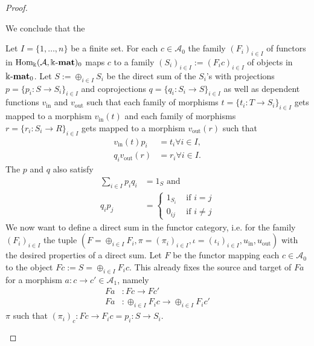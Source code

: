 \begin{proof}
\begin{enumerate}
\begin{subproof}[Proof of (ii)]
We conclude that the 
\end{subproof}

\begin{subproof}[Proof of (ii)]
Let $I = \{1,\dots,n\}$ be a finite set. For each $c \in \mathcal{A}_{0}$ the family $(F_{i})_{i\in I}$ of functors in $\mathrm{Hom_{\Bbbk}}(\mathcal{A},\Bbbk\textnormal{-}\mathbf{mat})_{0}$ maps $c$ to a
family $(S_{i})_{i\in I} := (F_{i}c)_{i\in I}$ of objects in $\Bbbk\textnormal{-}\mathbf{mat}_{0}$. Let $S := \oplus_{i\in I} S_{i}$ be the direct sum of the $S_{i}$'s with projections
$p = \{ p_{i} : S \rightarrow S_{i}\}_{i\in I}$ and coprojections $q = \{ q_{i} : S_{i} \rightarrow S\}_{i\in I}$ as well as dependent functions
$v_{\text{in}}$ and $v_{\text{out}}$ such that each family of morphisms $t = \{ t_{i} : T \rightarrow S_{i}\}_{i\in I}$ gets mapped to a
morphism $v_{\text{in}}(t)$ and each family of morphisms $r = \{ r_{i} : S_{i} \rightarrow R\}_{i\in I}$ gets mapped to a
morphism $v_{\text{out}}(r)$ such that
\begin{align*}
v_{\text{in}}(t) p_{i} &= t_{i} \forall i\in I, \\
q_{i} v_{\text{out}}(r) &= r_{i} \forall i\in I.
\end{align*}
The $p$ and $q$ also satisfy
\begin{align*}
\sum_{i\in I} p_{i} q_{i} &= 1_{S} \text{  and  } \\
q_{i} p_{j} &= \begin{cases}
            1_{S_{i}} & \text{ if } i = j \\
            0_{ij} & \text{ if } i \neq j
        \end{cases}
\end{align*}
We now want to define a direct sum in the functor category, i.e. for the family $(F_{i})_{i\in I}$ the tuple
$(F = \oplus_{i\in I} F_{i}, \pi = (\pi_{i})_{i\in I}, \iota = (\iota_{i})_{i\in I}, u_{\text{in}}, u_{\text{out}})$ with the desired properties of a direct sum.
Let $F$ be the functor mapping each $c\in \mathcal{A}_{0}$ to the object $Fc := S = \oplus_{i\in I} F_{i}c$. This already fixes the source and target of
$Fa$ for a morphism $a : c \rightarrow c' \in \mathcal{A}_{1}$, namely
\begin{align*}
Fa &: Fc \rightarrow Fc' \\
Fa &: \oplus_{i\in I} F_{i}c \rightarrow \oplus_{i\in I} F_{i}c'
\end{align*}
$\pi$ such that $(\pi_{i})_{c} : Fc \rightarrow F_{i}c = p_{i} : S \rightarrow S_{i}$.
\end{subproof}


\end{enumerate}
\end{proof}
